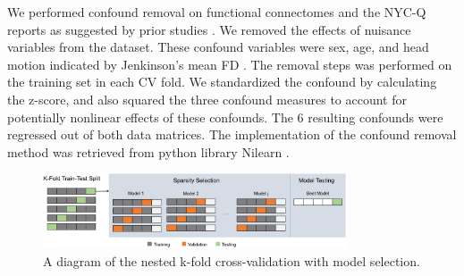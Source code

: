 We performed confound removal on functional connectomes and the NYC-Q reports as suggested by prior studies \cite{Smith2015}. 
We removed the effects of nuisance variables from the dataset. These confound variables were sex, age, and head motion indicated by Jenkinson’s mean FD \cite{Jenkinson2002}.%
The removal steps was performed on the training set in each CV fold. We standardized the confound by calculating the z-score, and also squared the three confound measures to account for potentially nonlinear effects of these confounds. The 6 resulting confounds were regressed out of both data matrices. The implementation of the confound removal method \cite{Friston1994} 
was retrieved from python library Nilearn \cite[\url{http://nilearn.github.io/}, version 0.3.1]{Abraham2014}.

\begin{figure}
	\centering
	\includegraphics[width=0.8\textwidth]{chapters/img/study2fig1.png}
	\caption{A diagram of the nested k-fold cross-validation with model selection.} 
	\label{fig:study2:fig1}
\end{figure}

